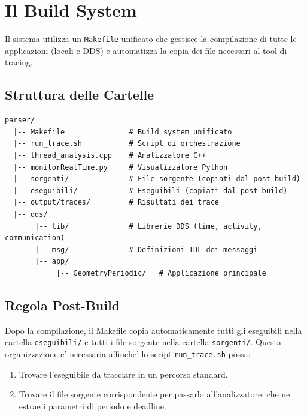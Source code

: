 \section{Il Build System}
\label{sec:build}

Il sistema utilizza un \texttt{Makefile} unificato che gestisce la
compilazione di tutte le applicazioni (locali e DDS) e automatizza
la copia dei file necessari al tool di tracing.

\subsection{Struttura delle Cartelle}
\label{subsec:folders}

\begin{verbatim}
parser/
  |-- Makefile               # Build system unificato
  |-- run_trace.sh           # Script di orchestrazione
  |-- thread_analysis.cpp    # Analizzatore C++
  |-- monitorRealTime.py     # Visualizzatore Python
  |-- sorgenti/              # File sorgente (copiati dal post-build)
  |-- eseguibili/            # Eseguibili (copiati dal post-build)
  |-- output/traces/         # Risultati dei trace
  |-- dds/
       |-- lib/              # Librerie DDS (time, activity, communication)
       |-- msg/              # Definizioni IDL dei messaggi
       |-- app/
            |-- GeometryPeriodic/   # Applicazione principale
\end{verbatim}

\subsection{Regola Post-Build}
\label{subsec:postbuild}

Dopo la compilazione, il Makefile copia automaticamente tutti gli
eseguibili nella cartella \texttt{eseguibili/} e tutti i file sorgente
nella cartella \texttt{sorgenti/}. Questa organizzazione e' necessaria
affinche' lo script \texttt{run\_trace.sh} possa:

\begin{enumerate}
    \item Trovare l'eseguibile da tracciare in un percorso standard.
    \item Trovare il file sorgente corrispondente per passarlo
          all'analizzatore, che ne estrae i parametri di periodo e deadline.
\end{enumerate}

